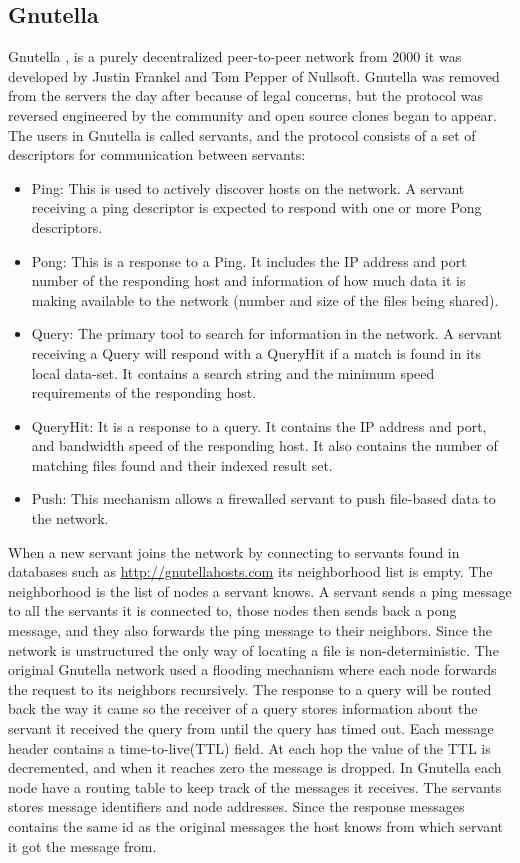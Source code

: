 \subsection{Gnutella}
\label{sec:gnutella}
Gnutella \citep{Androutsellis-Theotokis:2004:SPC:1041680.1041681},\citep{gnutella:specifikation} is a purely decentralized peer-to-peer network from 2000 it was developed by Justin Frankel and Tom Pepper of Nullsoft. Gnutella was removed from the servers the day after because of legal concerns, but the protocol was reversed engineered by the community and open source clones began to appear.
The users in Gnutella is called servants, and the protocol consists of a set of descriptors for communication between servants:
\begin{itemize}
\item Ping: This is used to actively discover hosts on the network. A servant receiving a ping descriptor is expected to respond with one or more Pong descriptors.
\item Pong: This is a response to a Ping. It includes the IP address and port number of the responding host and information of how much data it is making available to the network (number and size of the files being shared).
\item Query: The primary tool to search for information in the network. A servant receiving a Query will respond with a QueryHit if a match is found in its local data-set. It contains a search string and the minimum speed requirements of the responding host.
\item QueryHit: It is a response to a query. It contains the IP address and port, and bandwidth speed of the responding host. It also contains the number of matching files found and their indexed result set.
\item Push: This mechanism allows a firewalled servant to push file-based data to the network.
\end{itemize}
When a new servant joins the network by connecting to servants found in databases such as \url{http://gnutellahosts.com} its neighborhood list is empty. The neighborhood is the list of nodes a servant knows. A servant sends a ping message to all the servants it is connected to, those nodes then sends back a pong message, and they also forwards the ping message to their neighbors.
Since the network is unstructured the only way of locating a file is non-deterministic. The original Gnutella network used a flooding mechanism where each node forwards the request to its neighbors recursively. The response to a query will be routed back the way it came so the receiver of a query stores information about the servant it received the query from until the query has timed out. Each message header contains a time-to-live(TTL) field. At each hop the value of the TTL is decremented, and when it reaches zero the message is dropped. In Gnutella each node have a routing table to keep track of the messages it receives. The servants stores message identifiers and node addresses. Since the response messages contains the same id as the original messages the host knows from which servant it got the message from.
